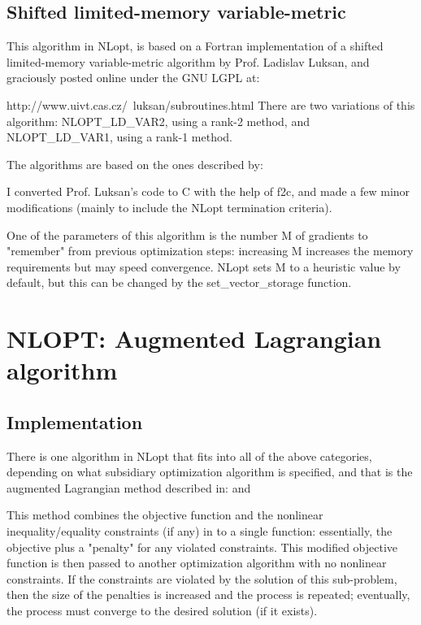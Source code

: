 \subsection{Shifted limited-memory variable-metric}
This algorithm in NLopt, is based on a Fortran implementation of a shifted limited-memory variable-metric algorithm by Prof. Ladislav Luksan, and graciously posted online under the GNU LGPL at: 

http://www.uivt.cas.cz/~luksan/subroutines.html 
There are two variations of this algorithm: NLOPT\_LD\_VAR2, using a rank-2 method, and NLOPT\_LD\_VAR1, using a rank-1 method. 

The algorithms are based on the ones described by: \cite{Vlcek_2006}



I converted Prof. Luksan's code to C with the help of f2c, and made a few minor modifications (mainly to include the NLopt termination criteria). 

One of the parameters of this algorithm is the number M of gradients to "remember" from previous optimization steps: increasing M increases the memory requirements but may speed convergence. NLopt sets M to a heuristic value by default, but this can be changed by the set\_vector\_storage function. 




\section{NLOPT: Augmented Lagrangian algorithm}
\label{AugmentedLagrangian}

\subsection{Implementation}
There is one algorithm in NLopt that fits into all of the above categories, depending on what subsidiary optimization algorithm is specified, and that is the augmented Lagrangian method described in: \cite{Conn_1991} and \cite{Birgin_2008}



This method combines the objective function and the nonlinear inequality/equality constraints (if any) in to a single function: essentially, the objective plus a "penalty" for any violated constraints. This modified objective function is then passed to another optimization algorithm with no nonlinear constraints. If the constraints are violated by the solution of this sub-problem, then the size of the penalties is increased and the process is repeated; eventually, the process must converge to the desired solution (if it exists). 

